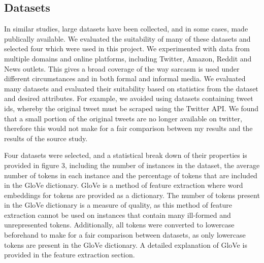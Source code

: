 \documentclass[12pt,a4paper]{article}
\begin{document}
\subsection{Datasets}
\noindent In similar studies, large datasets have been collected, and in some cases, made publically available. We evaluated the suitability of many of these datasets and selected four which were used in this project. We experimented with data from multiple domains and online platforms, including Twitter, Amazon, Reddit and News outlets. This gives a broad coverage of the way sarcasm is used under different circumstances and in both formal and informal media. We evaluated many datasets and evaluated their suitability based on statistics from the dataset and desired attributes. For example, we avoided using datasets containing tweet ids, whereby the original tweet must be scraped using the Twitter API. We found that a small portion of the original tweets are no longer available on twitter, therefore this would not make for a fair comparison between my results and the results of the source study.

Four datasets were selected, and a statistical break down of their properties is provided in figure 3, including the number of instances in the dataset, the average number of tokens in each instance and the percentage of tokens that are included in the GloVe dictionary. GloVe is a method of feature extraction where word embeddings for tokens are provided as a dictionary. The number of tokens present in the GloVe dictionary is a measure of quality, as this method of feature extraction cannot be used on instances that contain many ill-formed and unrepresented tokens. Additionally, all tokens were converted to lowercase beforehand to make for a fair comparison between datasets, as only lowercase tokens are present in the GloVe dictionary. A detailed explanation of GloVe is provided in the feature extraction section.
\end{document}
